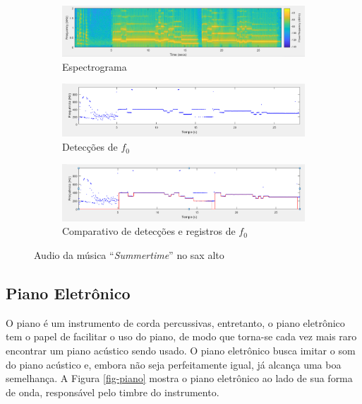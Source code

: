 \begin{figure}
	
	\begin{subfigure}{1\textwidth}
		\includegraphics[width=\linewidth]{pasta1_figuras/sax-summer-2.png}
		\caption{Espectrograma}
		\label{fig-sax-summer-2}
	\end{subfigure}
	
	\begin{subfigure}{1\textwidth}
		\includegraphics[width=\linewidth]{pasta1_figuras/sax-summer-3.png}
		\caption{Detecções de $f_0$}
		\label{fig-sax-summer-3}
	\end{subfigure}
	
	\begin{subfigure}{1\textwidth}
		\includegraphics[width=\linewidth]{pasta1_figuras/sax-summer-4.png}
		\caption{Comparativo de detecções e registros de $f_0$}
		\label{fig-sax-summer-4}
	\end{subfigure}
	\caption{Audio da música ``\textit{Summertime}'' no sax alto}
\end{figure}




\subsection{Piano Eletrônico}

O piano é um instrumento de corda percussivas, entretanto, o piano eletrônico tem o papel de facilitar o uso do piano, de modo que torna-se cada vez mais raro encontrar um piano acústico sendo usado. O piano eletrônico busca imitar o som do piano acústico e, embora não seja perfeitamente igual, já alcança uma boa semelhança. A Figura \ref{fig-piano} mostra o piano eletrônico ao lado de sua forma de onda, responsável pelo timbre do instrumento.

